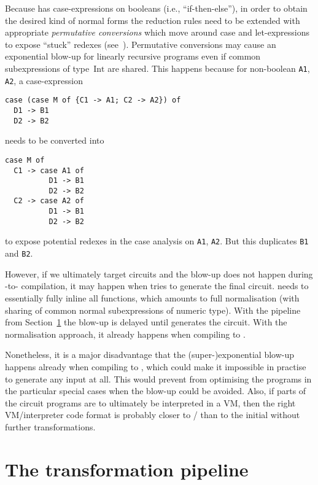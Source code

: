 \documentclass[
    9pt,            %
    techreport,        %
    affiltop,       %
]{art}
\begin{document}
Because \JuvixCore{} has case-expressions on booleans (i.e., ``if-then-else''), in order to obtain the desired kind of normal forms the reduction rules need to be extended with appropriate \emph{permutative conversions} which move around case and let-expressions to expose ``stuck'' redexes (see~\cite[Chapter~6]{basic-proof-theory}). Permutative conversions may cause an exponential blow-up for linearly recursive programs even if common subexpressions of type~$\mathrm{Int}$ are shared. This happens because for non-boolean \texttt{A1}, \texttt{A2}, a case-expression
\begin{verbatim}
case (case M of {C1 -> A1; C2 -> A2}) of
  D1 -> B1
  D2 -> B2
\end{verbatim}
needs to be converted into
\begin{verbatim}
case M of
  C1 -> case A1 of
          D1 -> B1
          D2 -> B2
  C2 -> case A2 of
          D1 -> B1
          D2 -> B2
\end{verbatim}
to expose potential redexes in the case analysis on \texttt{A1}, \texttt{A2}. But this duplicates \texttt{B1} and \texttt{B2}.

However, if we ultimately target circuits and the blow-up does not happen during \Juvix{}-to-\VampIR{} compilation, it
may happen when \VampIR{} tries to generate the final circuit. \VampIR{}
needs to essentially fully inline all functions, which amounts to full
normalisation (with sharing of common normal subexpressions of numeric
type). With the pipeline from
Section~\ref{sec_pipeline} the blow-up is delayed until \VampIR{}
generates the circuit. With the normalisation approach, it already
happens when compiling \Juvix{} to \VampIR{}.

Nonetheless, it is a major disadvantage that the (super-)exponential
blow-up happens already when compiling to \VampIR{}, which could make it
impossible in practise to generate any \VampIR{} input at all. This would
prevent \VampIR{} from optimising the programs in the particular special
cases when the blow-up could be avoided. Also, if parts of the circuit
programs are to ultimately be interpreted in a VM, then the right
VM/interpreter code format is probably closer to \Geb{}/\VampIR{} than to
the initial \JuvixCore{} without further transformations.

\section{The transformation pipeline}\label{sec_pipeline}
\end{document}
